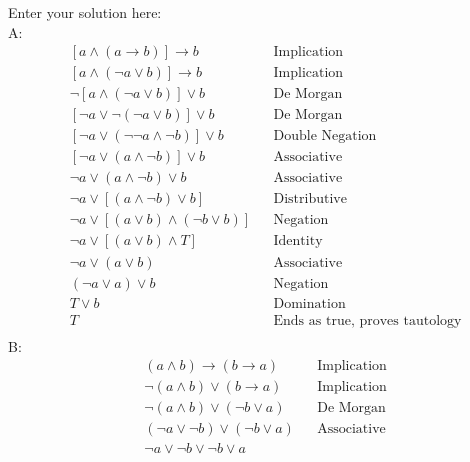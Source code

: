 \documentclass[10pt]{exam}
\begin{document}
\begin{questions}
\begin{solution}
    Enter your solution here:\\
    \large
    A: 
    \begin{align*}
        &[a \land (a \rightarrow b)] \rightarrow b
        && \text{Implication} \\[2pt]
        &[a \land (\lnot a \lor b)] \rightarrow b
        && \text{Implication} \\[2pt]
        &\lnot[a \land (\lnot a \lor b)] \lor b
        && \text{De Morgan} \\[2pt]
        &[\lnot a \lor \lnot(\lnot a \lor b)] \lor b
        && \text{De Morgan} \\[2pt]
        &[\lnot a \lor (\lnot\lnot a \land \lnot b)] \lor b
        && \text{Double Negation} \\[2pt]
        &[\lnot a \lor (a \land \lnot b)] \lor b
        && \text{Associative} \\[2pt]
        &\lnot a \lor (a \land \lnot b) \lor b
        && \text{Associative} \\[2pt]
        &\lnot a \lor [(a \land \lnot b) \lor b]
        && \text{Distributive} \\[2pt]
        &\lnot a \lor [(a \lor b) \land (\lnot b \lor b)]
        && \text{Negation} \\[2pt]
        &\lnot a \lor [(a \lor b) \land T]
        && \text{Identity} \\[2pt]
        &\lnot a \lor (a \lor b)
        && \text{Associative} \\[2pt]
        &(\lnot a \lor a) \lor b
        && \text{Negation} \\[2pt]
        &T \lor b
        && \text{Domination} \\[2pt]
        &T
        && \text{Ends as true, proves tautology} \\[2pt]
    \end{align*}
    B: 
    \begin{align*}
        &(a \wedge b) \rightarrow (b \rightarrow a)
        && \text{Implication} \\[2pt]
        & \lnot(a \land b) \lor (b \rightarrow a)
        && \text{Implication} \\[2pt]
        & \lnot (a \land b) \lor (\lnot b \lor a)
        && \text{De Morgan} \\[2pt]
        & (\lnot a \lor \lnot b) \lor (\lnot b \lor a)
        && \text{Associative} \\[2pt]
        & \lnot a \lor \lnot b \lor \lnot b \lor a

\end{align*}
\end{solution}
\end{questions}
\end{document}
